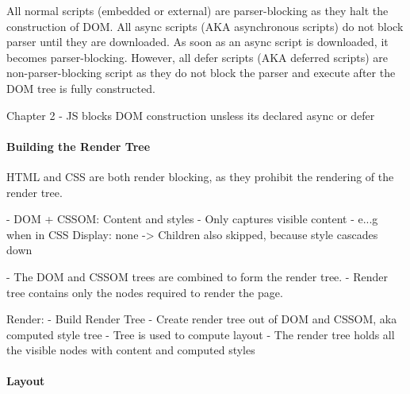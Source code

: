 All normal scripts (embedded or external) are parser-blocking as they halt the construction of DOM. All async scripts (AKA asynchronous scripts) do not block parser until they are downloaded. As soon as an async script is downloaded, it becomes parser-blocking. However, all defer scripts (AKA deferred scripts) are non-parser-blocking script as they do not block the parser and execute after the DOM tree is fully constructed.




Chapter 2
- JS blocks DOM construction unsless its declared async or defer







\paragraph{Building the Render Tree}


HTML and CSS are both render blocking, as they prohibit the rendering of the render tree.

- DOM + CSSOM: Content and styles
- Only captures visible content
- e...g when in CSS Display: none -> Children also skipped, because style cascades down

- The DOM and CSSOM trees are combined to form the render tree.
- Render tree contains only the nodes required to render the page.



Render:
- Build Render Tree
- Create render tree out of DOM and CSSOM, aka computed style tree
- Tree is used to compute layout
- The render tree holds all the visible nodes with content and computed styles










\paragraph{Layout}





